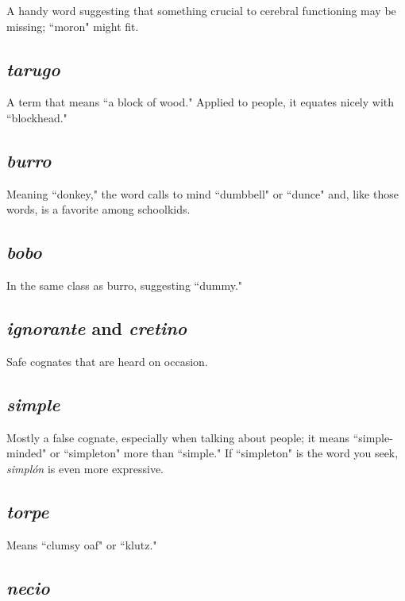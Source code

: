A handy word suggesting that something crucial to
cerebral functioning may be missing; ``moron" might fit.

\subsection{\emph{tarugo}}

A term that means ``a block of wood." Applied to
people, it equates nicely with ``blockhead."

\subsection{\emph{burro}}

Meaning ``donkey," the word calls to mind ``dumbbell" or ``dunce" and, like those words, is a favorite among schoolkids.

\subsection{\emph{bobo}}

In the same class as burro, suggesting ``dummy."

\subsection{\emph{ignorante} and \emph{cretino}}

Safe cognates that are heard on occasion.

\subsection{\emph{simple}}

Mostly a false cognate, especially when talking
about people; it means ``simple-minded" or ``simpleton" more than
``simple." If ``simpleton" is the word you seek, \emph{simplón} is even more
expressive.

\subsection{\emph{torpe}}

Means ``clumsy oaf" or ``klutz."

\subsection{\emph{necio}}

